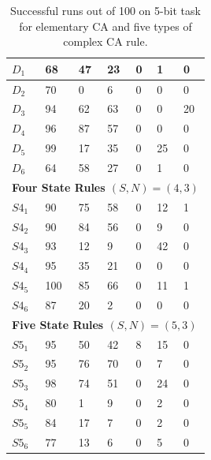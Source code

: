 \documentclass{elsarticle}
\begin{document}
\begin{multicols}{2}
\begin{table}[!htbp]
\begin{tabular}{|l|l|l|l|l|l|l|}
			$D_{1}$  & 68  & 47  & 23  & 0  & 1  & 0  \\ \hline
			$D_{2}$  & 70  & 0   & 6   & 0  & 0  & 0  \\ \hline
			$D_{3}$  & 94  & 62  & 63  & 0  & 0  & 20 \\ \hline
			$D_{4}$  & 96  & 87  & 57  & 0  & 0  & 0  \\ \hline
			$D_{5}$  & 99  & 17  & 35  & 0  & 25 & 0  \\ \hline
			$D_{6}$  & 64  & 58  & 27  & 0  & 1  & 0  \\ \hline
			\multicolumn{7}{|l|}{\textbf{Four State Rules \boldmath$(S,N) = (4,3)$}} \\ 
			\hline
			$S4_{1}$ & 90  & 75  & 58  & 0  & 12 & 1  \\ \hline
			$S4_{2}$ & 90  & 84  & 56  & 0  & 9  & 0  \\ \hline
			$S4_{3}$ & 93  & 12  & 9   & 0  & 42 & 0  \\ \hline
			$S4_{4}$ & 95  & 35  & 21  & 0  & 0  & 0  \\ \hline
			$S4_{5}$ & 100 & 85  & 66  & 0  & 11 & 1  \\ \hline
			$S4_{6}$ & 87  & 20  & 2   & 0  & 0  & 0  \\ \hline
			\multicolumn{7}{|l|}{\textbf{Five State Rules \boldmath$(S,N) = (5,3)$}} \\ 
			\hline
			$S5_{1}$ & 95  & 50  & 42  & 8  & 15 & 0  \\ \hline
			$S5_{2}$ & 95  & 76  & 70  & 0  & 7  & 0  \\ \hline
			$S5_{3}$ & 98  & 74  & 51  & 0  & 24 & 0  \\ \hline
			$S5_{4}$ & 80  & 1   & 9   & 0  & 2  & 0  \\ \hline
			$S5_{5}$ & 84  & 17  & 7   & 0  & 2  & 0  \\ \hline
			$S5_{6}$ & 77  & 13  & 6   & 0  & 5  & 0  \\ \hline
		\end{tabular}
		\caption{Successful runs out of 100 on 5-bit task for elementary CA and five 
		types of complex CA rule.}
		\label{table:results}
	\end{table}
	
	
	

\end{multicols}
\end{document}
